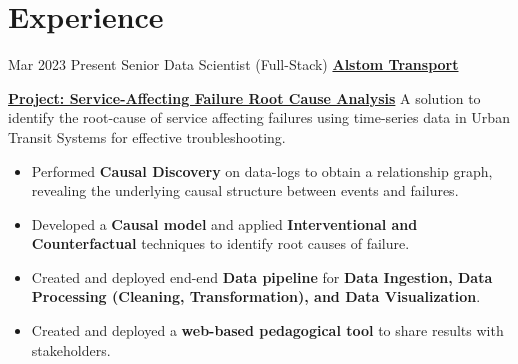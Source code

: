\documentclass[letterpaper]{DS_class_file} %
\begin{document}
\makeprofile %



\section{\faCogs Experience}

\begin{twenty}
    \twentyitem
        {Mar 2023}
		{Present}
		{Senior Data Scientist (Full-Stack)}
		{\href{https://www.alstom.com/alstom-india}{\textbf{Alstom Transport}}}
		{}
		{\underline{\textbf{Project: Service-Affecting Failure Root Cause Analysis}}
        \vspace{0.1cm} 
        \newline
        A solution to identify the root-cause of service affecting failures using time-series data in Urban Transit Systems for effective troubleshooting. 
        \begin{itemize}
            \item Performed \textbf{Causal Discovery} on data-logs to obtain a relationship graph, revealing the underlying causal structure between events and failures.
            \item Developed a \textbf{Causal model} and applied \textbf{Interventional and Counterfactual} techniques to identify root causes of failure. 
            \item Created and deployed end-end \textbf{Data pipeline} for \textbf{Data Ingestion, Data Processing (Cleaning, Transformation), and Data Visualization}.
            \item Created and deployed a \textbf{web-based pedagogical tool} to share results with stakeholders.

\end{itemize}}
\end{twenty}
\end{document}
